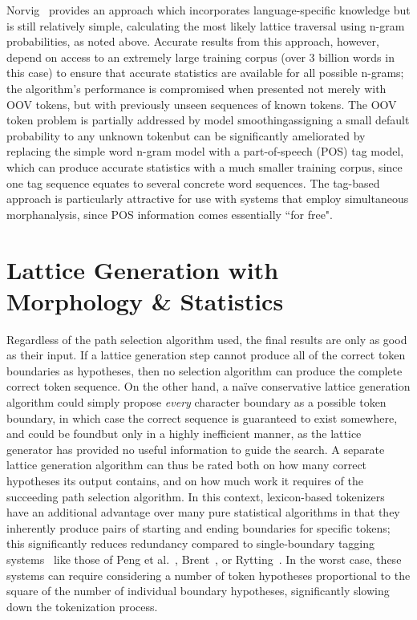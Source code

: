 Norvig~\cite{norvig14} provides an approach which incorporates language-specific knowledge but is still relatively simple, calculating the most likely lattice traversal using n-gram probabilities, as noted above. Accurate results from this approach, however, depend on access to an extremely large training corpus (over 3 billion words in this case) to ensure that accurate statistics are available for all possible n-grams; the algorithm's performance is compromised when presented not merely with OOV tokens, but with previously unseen sequences of known tokens. The OOV token problem is partially addressed by model smoothing\textemdash assigning a small default probability to any unknown token\textemdash but can be significantly ameliorated by replacing the simple word n-gram model with a part-of-speech (POS) tag model, which can produce accurate statistics with a much smaller training corpus, since one tag sequence equates to several concrete word sequences. The tag-based approach is particularly attractive for use with systems that employ simultaneous morphanalysis, since POS information comes essentially ``for free".

\section{Lattice Generation with Morphology \& Statistics}

Regardless of the path selection algorithm used, the final results are only as good as their input. If a lattice generation step cannot produce all of the correct token boundaries as hypotheses, then no selection algorithm can produce the complete correct token sequence. On the other hand, a na\"ive conservative lattice generation algorithm could simply propose \textit{every} character boundary as a possible token boundary, in which case the correct sequence is guaranteed to exist somewhere, and could be found\textemdash but only in a highly inefficient manner, as the lattice generator has provided no useful information to guide the search. A separate lattice generation algorithm can thus be rated both on how many correct hypotheses its output contains, and on how much work it requires of the succeeding path selection algorithm. In this context, lexicon-based tokenizers have an additional advantage over many pure statistical algorithms in that they inherently produce pairs of starting and ending boundaries for specific tokens; this significantly reduces redundancy compared to single-boundary tagging systems~\cite{kudo04} like those of Peng et al.~\cite{peng04}, Brent~\cite{brent99}, or Rytting~\cite{rytting04}. In the worst case, these systems can require considering a number of token hypotheses proportional to the square of the number of individual boundary hypotheses, significantly slowing down the tokenization process.

